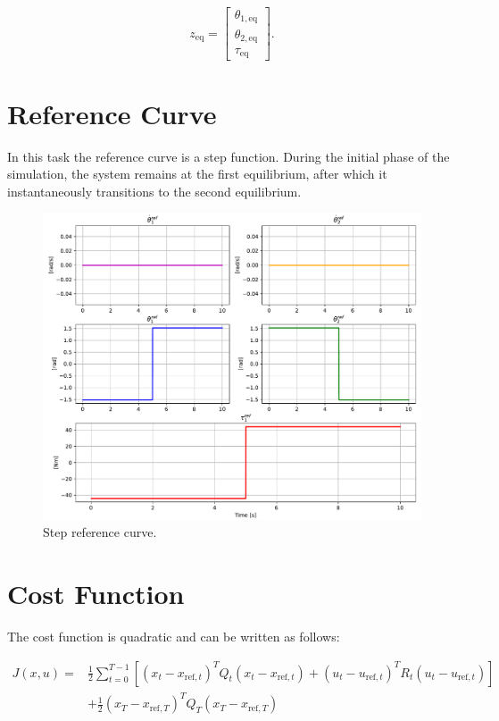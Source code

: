 \[
z_{\text{eq}} = \begin{bmatrix} \theta_{1,\text{eq}} \\ \theta_{2,\text{eq}} \\ \tau_{\text{eq}} \end{bmatrix}.
\]

\section{Reference Curve}
In this task the reference curve is a step function. During the initial phase of the simulation, the system remains at the first equilibrium, after which it instantaneously transitions to the second equilibrium.

\begin{figure}[htb]
    \centering
    \includegraphics[width=1\linewidth]{img/1-Task1/Reference.pdf}
    \caption{Step reference curve.} %
    \label{fig:step}
\end{figure}

\section{Cost Function}
The cost function is quadratic and can be written as follows:

\begin{equation}
\begin{aligned}
J(x, u) =
&\frac{1}{2} \sum_{t=0}^{T-1} \left[ (x_t - x_{\text{ref},t})^T Q_t (x_t - x_{\text{ref},t}) + (u_t - u_{\text{ref},t})^T R_t (u_t - u_{\text{ref},t}) \right] \\
&+ \frac{1}{2} (x_T - x_{\text{ref},T})^T Q_T (x_T - x_{\text{ref},T})
\end{aligned}
\label{eq:dynamics}
\end{equation}


